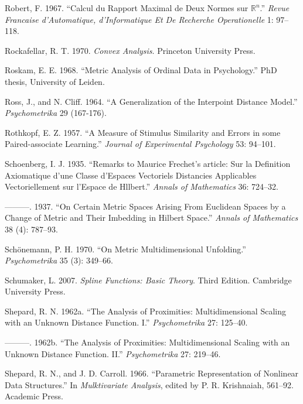 \documentclass[
  12pt,
  letterpaper,
  DIV=11,
  numbers=noendperiod]{scrreprt}
\newlength{\cslhangindent}
\newenvironment{CSLReferences}[2] %
 {\begin{list}{}{%
  \setlength{\itemindent}{0pt}
  \setlength{\leftmargin}{0pt}
  \setlength{\parsep}{0pt}
  \ifodd #1
   \setlength{\leftmargin}{\cslhangindent}
   \setlength{\itemindent}{-1\cslhangindent}
  \fi
  \setlength{\itemsep}{#2\baselineskip}}}
 {\end{list}}
\theoremstyle{remark}
\begin{document}
\begin{CSLReferences}{1}{0}
Robert, F. 1967. {``{Calcul du Rapport Maximal de Deux Normes sur
\(\mathbb{R}^n\)}.''} \emph{Revue Francaise d'Automatique,
d'Informatique Et De Recherche Operationelle} 1: 97--118.

Rockafellar, R. T. 1970. \emph{Convex Analysis}. Princeton University
Press.

Roskam, E. E. 1968. {``{Metric Analysis of Ordinal Data in
Psychology}.''} PhD thesis, University of Leiden.

Ross, J., and N. Cliff. 1964. {``{A Generalization of the Interpoint
Distance Model}.''} \emph{Psychometrika} 29 (167-176).

Rothkopf, E. Z. 1957. {``{A Measure of Stimulus Similarity and Errors in
some Paired-associate Learning}.''} \emph{Journal of Experimental
Psychology} 53: 94--101.

Schoenberg, I. J. 1935. {``{Remarks to Maurice Frechet's article: Sur la
Definition Axiomatique d'une Classe d'Espaces Vectoriels Distancies
Applicables Vectoriellement sur l'Espace de Hllbert}.''} \emph{Annals of
Mathematics} 36: 724--32.

---------. 1937. {``{On Certain Metric Spaces Arising From Euclidean
Spaces by a Change of Metric and Their Imbedding in Hilbert Space}.''}
\emph{Annals of Mathematics} 38 (4): 787--93.

Schönemann, P. H. 1970. {``{On Metric Multidimensional Unfolding}.''}
\emph{Psychometrika} 35 (3): 349--66.

Schumaker, L. 2007. \emph{{Spline Functions: Basic Theory}}. Third
Edition. Cambridge University Press.

Shepard, R. N. 1962a. {``{The Analysis of Proximities: Multidimensional
Scaling with an Unknown Distance Function. I}.''} \emph{Psychometrika}
27: 125--40.

---------. 1962b. {``{The Analysis of Proximities: Multidimensional
Scaling with an Unknown Distance Function. II}.''} \emph{Psychometrika}
27: 219--46.

Shepard, R. N., and J. D. Carroll. 1966. {``Parametric Representation of
Nonlinear Data Structures.''} In \emph{Mulktivariate Analysis}, edited
by P. R. Krishnaiah, 561--92. Academic Press.


\end{CSLReferences}
\end{document}
